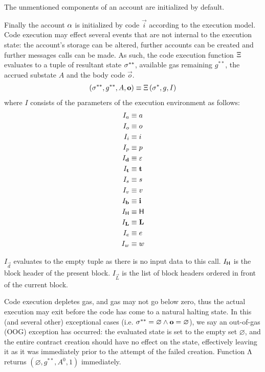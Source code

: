 The unmentioned components of an account are initialized by default.

Finally the account $\mathbf{\alpha}$ is initialized by \cvm code $\vec{i}$ according to the execution model.
Code execution may effect several events that are not internal to the execution state:
the account's storage can be altered, further accounts can be created and further messages calls can be made.
As such, the code execution function $\mathrm{\Xi}$ evaluates to a tuple of resultant state $\mathbf{\sigma}^{**}$, available gas remaining $g^{**}$, the accrued substate $A$ and the body code $\vec{o}$.
\begin{align}
	\left(\mathbf{\sigma}^{**}, g^{**},  A, \mathbf{o} \right) \equiv \mathrm{\Xi}\left(\mathbf{\sigma}^*, g, I\right)
\end{align}
where $I$ consists of the parameters of the execution environment as follows:
\begin{align}
	I_a &\equiv a\\
	I_o &\equiv o\\
	I_i &\equiv i\\
	I_p &\equiv p\\
	I_{\mathbf{d}} &\equiv \mathbb{\varepsilon}\\
	I_{\mathbf{t}} & \equiv \mathbf{t}\\
	I_s &\equiv s\\
	I_v &\equiv v\\
	I_{\mathbf{b}} &\equiv \mathbf{i}\\
	I_{\textsf{H}} & \equiv \textsf{H} \\
	I_{\mathbf{L}} & \equiv \mathbf{L} \\ 
	I_e &\equiv e\\
	I_w &\equiv w
\end{align}

$I_{\vec{d}}$ evaluates to the empty tuple as there is no input data to this call. 
$I_{\textsf{H}}$ is the block header of the present block.
$I_\vec{L}$ is the list of block headers ordered in front of the current block.

Code execution depletes gas, and gas may not go below zero, thus the actual execution may exit before the code has come to a natural halting state.
In this (and several other) exceptional cases (i.e. $\mathbf{\sigma}^{**}=\varnothing \land \mathbf{o}=\varnothing$), we say an out-of-gas (OOG) exception has occurred:
the evaluated state is set to the empty set $\varnothing$, 
and the entire contract creation should have no effect on the state, effectively leaving it as it was immediately prior to the attempt of the failed creation.
%
Function $\mathrm{\Lambda}$ returns $(\varnothing,g^{**},A^0,1)$ immediately. 


